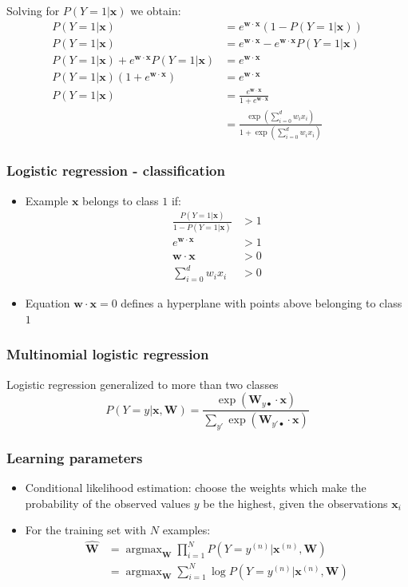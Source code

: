 \documentclass[14pt,mathserif,dvipsnames,usenames]{beamer}
\DeclareMathOperator*{\argmax}{argmax}
\newcommand{\x}{\mathbf{x}}
\newcommand{\w}{\mathbf{w}}
\newcommand{\W}{\mathbf{W}}
\begin{document}
\begin{frame}
Solving for $P(Y=1|\x)$ we obtain:
\begin{align*}
  P(Y=1|\x)  & = e^{\w\cdot\x}(1-P(Y=1|\x))\\
  P(Y=1|\x)  & =  e^{\w\cdot\x} -  e^{\w\cdot\x}P(Y=1|\x)\\
  P(Y=1|\x) + e^{\w\cdot\x}P(Y=1|\x) & = e^{\w\cdot\x}\\
  P(Y=1|\x)(1  + e^{\w\cdot\x})      & = e^{\w\cdot\x}\\
  P(Y=1|\x) & = \frac{e^{\w\cdot\x}}{1+e^{\w\cdot\x}} \\
  & = \frac{\exp\left(\sum_{i=0}^d w_i
      x_i\right)}{1+\exp\left(\sum_{i=0}^d w_i x_i\right)}
\end{align*}
\end{frame}


\begin{frame}
 \frametitle{Logistic regression - classification}
\begin{itemize}
 \item Example $\x$ belongs to class $1$ if:
\begin{align*}
 \frac{P(Y=1|\x)}{1-P(Y=1|\x)} & > 1 \\
 e^{\w\cdot\x}   & > 1 \\
 \w\cdot\x       & > 0 \\
 \sum_{i=0}^{d} w_i x_i          & > 0 
\end{align*}
\item Equation $\w \cdot \x = 0$ defines a hyperplane with points above
  belonging to class $1$
\end{itemize}

\end{frame}


\begin{frame}
  \frametitle{Multinomial logistic regression}
  \begin{block}{}
    Logistic regression generalized to more than two classes
    \[
    P(Y=y|\x,\W)  = \frac{ \exp(\W_{y\bullet} \cdot \x) }
    {\sum_{y'}      \exp(\W_{y'\bullet} \cdot \x) }
    \]
  \end{block}
\end{frame}

\begin{frame}
  \frametitle{Learning parameters}
  \begin{itemize}
  \item Conditional likelihood estimation: choose the weights which
    make the probability of the observed values $y$ be the highest,
    given the observations $\x_i$
  \item For the training set with $N$ examples:
    \begin{align*}
      \mathbf{\hat{\W}} & = \argmax_{\W} \prod_{i=1}^{N}P(Y=y^{(n)}|\x^{(n)},\W)\\
      & = \argmax_{\W} \sum_{i=1}^N \log P(Y=y^{(n)}|\x^{(n)},\W)
    \end{align*}
  \end{itemize}
\end{frame}
\end{document}
